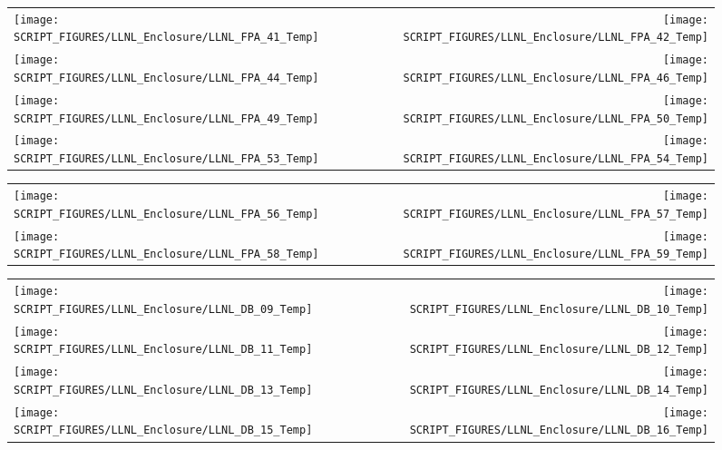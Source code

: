 \begin{figure}[p]
\begin{tabular*}{\textwidth}{l@{\extracolsep{\fill}}r}
\texttt{[image: SCRIPT\_FIGURES/LLNL\_Enclosure/LLNL\_FPA\_41\_Temp]} &
\texttt{[image: SCRIPT\_FIGURES/LLNL\_Enclosure/LLNL\_FPA\_42\_Temp]} \\
\texttt{[image: SCRIPT\_FIGURES/LLNL\_Enclosure/LLNL\_FPA\_44\_Temp]} &
\texttt{[image: SCRIPT\_FIGURES/LLNL\_Enclosure/LLNL\_FPA\_46\_Temp]} \\
\texttt{[image: SCRIPT\_FIGURES/LLNL\_Enclosure/LLNL\_FPA\_49\_Temp]} &
\texttt{[image: SCRIPT\_FIGURES/LLNL\_Enclosure/LLNL\_FPA\_50\_Temp]} \\
\texttt{[image: SCRIPT\_FIGURES/LLNL\_Enclosure/LLNL\_FPA\_53\_Temp]} &
\texttt{[image: SCRIPT\_FIGURES/LLNL\_Enclosure/LLNL\_FPA\_54\_Temp]}
\end{tabular*}
\end{figure}

\begin{figure}[p]
\begin{tabular*}{\textwidth}{l@{\extracolsep{\fill}}r}
\texttt{[image: SCRIPT\_FIGURES/LLNL\_Enclosure/LLNL\_FPA\_56\_Temp]} &
\texttt{[image: SCRIPT\_FIGURES/LLNL\_Enclosure/LLNL\_FPA\_57\_Temp]} \\
\texttt{[image: SCRIPT\_FIGURES/LLNL\_Enclosure/LLNL\_FPA\_58\_Temp]} &
\texttt{[image: SCRIPT\_FIGURES/LLNL\_Enclosure/LLNL\_FPA\_59\_Temp]}
\end{tabular*}
\end{figure}

\begin{figure}[p]
\begin{tabular*}{\textwidth}{l@{\extracolsep{\fill}}r}
\texttt{[image: SCRIPT\_FIGURES/LLNL\_Enclosure/LLNL\_DB\_09\_Temp]} &
\texttt{[image: SCRIPT\_FIGURES/LLNL\_Enclosure/LLNL\_DB\_10\_Temp]} \\
\texttt{[image: SCRIPT\_FIGURES/LLNL\_Enclosure/LLNL\_DB\_11\_Temp]} &
\texttt{[image: SCRIPT\_FIGURES/LLNL\_Enclosure/LLNL\_DB\_12\_Temp]} \\
\texttt{[image: SCRIPT\_FIGURES/LLNL\_Enclosure/LLNL\_DB\_13\_Temp]} &
\texttt{[image: SCRIPT\_FIGURES/LLNL\_Enclosure/LLNL\_DB\_14\_Temp]} \\
\texttt{[image: SCRIPT\_FIGURES/LLNL\_Enclosure/LLNL\_DB\_15\_Temp]} &
\texttt{[image: SCRIPT\_FIGURES/LLNL\_Enclosure/LLNL\_DB\_16\_Temp]}
\end{tabular*}
\end{figure}

